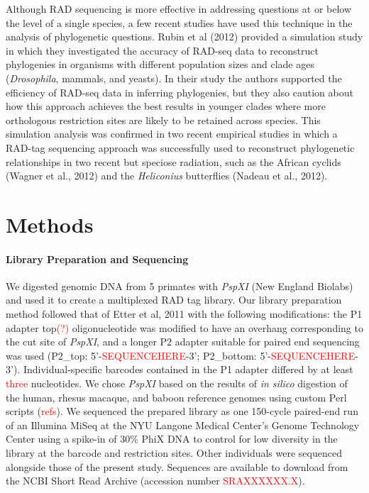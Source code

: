 \documentclass[12pt]{article}
\begin{document}
Although RAD sequencing is more effective in addressing questions at or below the level of a single species, a few recent studies have used this technique in the analysis of phylogenetic questions. Rubin et al (2012) provided a simulation study in which they investigated the accuracy of RAD-seq data to reconstruct phylogenies in organisms with different population sizes and clade ages (\emph{Drosophila}, mammals, and yeasts). In their study the authors supported the efficiency of RAD-seq data in inferring phylogenies, but they also caution about how this approach achieves the best results in younger clades where more orthologous restriction sites are likely to be retained across species. This simulation analysis was confirmed in two recent empirical studies in which a RAD-tag sequencing approach was successfully used to reconstruct phylogenetic relationships in two recent but speciose radiation, such as the African cyclids (Wagner et al., 2012) and the \emph{Heliconius} butterﬂies (Nadeau et al., 2012).

\section{Methods}

\paragraph{Library Preparation and Sequencing}

	We digested genomic DNA from 5 primates with \emph{PspXI} (New England Biolabs) and used it to create a multiplexed RAD tag library. Our library preparation method followed that of Etter et al, 2011 with the following modifications: the P1 adapter top\textcolor{red}{(?)} oligonucleotide was modified to have an overhang corresponding to the cut site of \emph{PspXI}, and a longer P2 adapter suitable for paired end sequencing was used (P2\_top: 5'-\textcolor{red}{SEQUENCEHERE}-3'; P2\_bottom: 5'-\textcolor{red}{SEQUENCEHERE}-3'). Individual-specific barcodes contained in the P1 adapter differed by at least \textcolor{red}{three} nucleotides. We chose \emph{PspXI} based on the results of \emph{in silico} digestion of the human, rhesus macaque, and baboon reference genomes using custom Perl scripts (\textcolor{red}{refs}). We sequenced the prepared library as one 150-cycle paired-end run of an Illumina MiSeq at the NYU Langone Medical Center's Genome Technology Center using a spike-in of 30\% PhiX DNA to control for low diversity in the library at the barcode and restriction sites. Other individuals were sequenced alongside those of the present study. Sequences are available to download from the NCBI Short Read Archive (accession number \textcolor{red}{SRAXXXXXX.X}).
\end{document}
